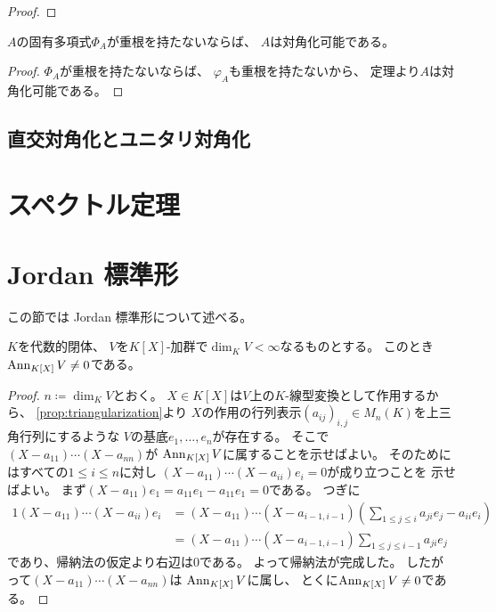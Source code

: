 \documentclass[report]{jlreq}
\begin{document}
\begin{proof}
    \TODO{}
\end{proof}

\begin{corollary}
    $A$の固有多項式$\Phi_A$が重根を持たないならば、
    $A$は対角化可能である。
\end{corollary}

\begin{proof}
    $\Phi_A$が重根を持たないならば、
    $\varphi_A$も重根を持たないから、
    定理より$A$は対角化可能である。
\end{proof}

\subsection{直交対角化とユニタリ対角化}

\TODO{}


%
\section{スペクトル定理}

\TODO{}


%
\section{Jordan 標準形}

この節では Jordan 標準形について述べる。

\begin{lemma}
    $K$を代数的閉体、
    $V$を$K[X]$-加群で$\dim_K V < \infty$なるものとする。
    このとき$\operatorname{Ann}_{K[X]} V \neq 0$である。
\end{lemma}

\begin{proof}
    $n \coloneqq \dim_K V$とおく。
    $X \in K[X]$は$V$上の$K$-線型変換として作用するから、
    \cref{prop:triangularization}より
    $X$の作用の行列表示$(a_{ij})_{i, j} \in M_{n}(K)$を上三角行列にするような
    $V$の基底$e_1, \dots, e_n$が存在する。
    そこで$(X - a_{11}) \cdots (X - a_{nn})$が
    $\operatorname{Ann}_{K[X]} V$に属することを示せばよい。
    そのためにはすべての$1 \le i \le n$に対し
    $(X - a_{11}) \cdots (X - a_{ii}) e_i = 0$が成り立つことを
    示せばよい。
    まず$(X - a_{11}) e_1 = a_{11} e_1 - a_{11} e_1 = 0$である。
    つぎに
    \begin{alignat}{1}
        (X - a_{11}) \cdots (X - a_{ii}) e_i
            &= (X - a_{11}) \cdots (X - a_{i - 1, i - 1})
                \left( \sum_{1 \le j \le i} a_{ji} e_j - a_{ii} e_i \right) \\
            &= (X - a_{11}) \cdots (X - a_{i - 1, i - 1})
                \sum_{1 \le j \le i - 1} a_{ji} e_j
    \end{alignat}
    であり、帰納法の仮定より右辺は$0$である。
    よって帰納法が完成した。
    したがって$(X - a_{11}) \cdots (X - a_{nn})$は
    $\operatorname{Ann}_{K[X]} V$に属し、
    とくに$\operatorname{Ann}_{K[X]} V \neq 0$である。
\end{proof}
\end{document}
